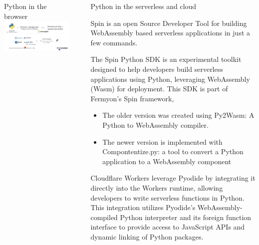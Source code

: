\documentclass[final]{beamer}
\newlength{\sepwidth}
\newlength{\colwidth}
\newcommand{\separatorcolumn}{\begin{column}{\sepwidth}\end{column}}
\begin{document}
\begin{frame}[t]
\begin{columns}[t]
\begin{column}{\colwidth}
\begin{block}{Python in the browser}
         \centering
                \includegraphics[width=0.7\linewidth]{figures/image.png}
        \end{block}
        \end{column}
        \separatorcolumn
            \begin{column}{\colwidth}
              \begin{block}{ Python in the serverless and cloud}

     \begin{minipage}[t]{\textwidth}
                   Spin is an open Source Developer Tool for building WebAssembly based serverless applications in just a few commands. \newline
                   

                   The Spin Python SDK is an experimental toolkit designed to help developers build serverless applications using Python, leveraging WebAssembly (Wasm) for deployment. This SDK is part of Fermyon's Spin framework, 

                    \begin{itemize}
                    \item The older version was created using Py2Wasm: A Python to WebAssembly compiler.

                    \item  The newer version is implemented with Compontentize.py: a tool to convert a Python application to a WebAssembly component

                    \end{itemize}
                 \end{minipage}
                    


     \begin{minipage}[t]{\textwidth}
                 Cloudflare Workers leverage Pyodide by integrating it directly into the Workers runtime, allowing developers to write serverless functions in Python. This integration utilizes Pyodide's WebAssembly-compiled Python interpreter and its foreign function interface to provide access to JavaScript APIs and dynamic linking of Python packages.


\end{minipage}
\end{block}
\end{column}
\end{columns}
\end{frame}
\end{document}
